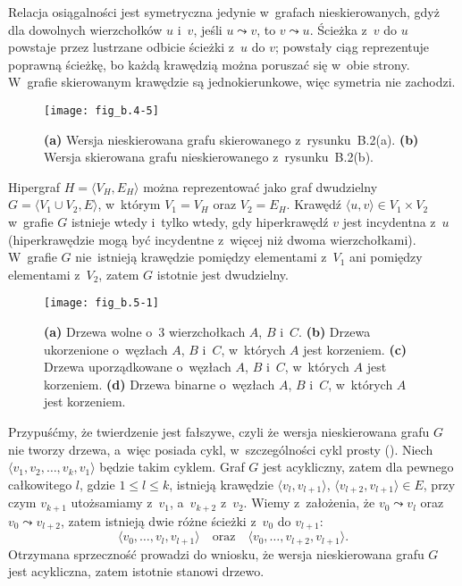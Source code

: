 Relacja osiągalności jest symetryczna jedynie w~grafach nieskierowanych, gdyż dla dowolnych wierzchołków $u$ i~$v$, jeśli $u\leadsto v$, to $v\leadsto u$.
Ścieżka z~$v$ do $u$ powstaje przez lustrzane odbicie ścieżki z~$u$ do $v$; powstały ciąg reprezentuje poprawną ścieżkę, bo każdą krawędzią można poruszać się w~obie strony.
W~grafie skierowanym krawędzie są jednokierunkowe, więc symetria nie zachodzi.

\exercise %
\begin{figure}[ht]
	\begin{center}
		\texttt{[image: fig\_b.4-5]}
	\end{center}
	\caption{{\sffamily\bfseries(a)} Wersja nieskierowana grafu skierowanego z~rysunku~B.2(a).
{\sffamily\bfseries(b)} Wersja skierowana grafu nieskierowanego z~rysunku~B.2(b).} \label{fig:B.4-5}
\end{figure}

\exercise %
Hipergraf $H=\langle V_H,E_H\rangle$ można reprezentować jako graf dwudzielny $G=\langle V_1\cup V_2,E\rangle$, w~którym $V_1=V_H$ oraz $V_2=E_H$.
Krawędź $\langle u,v\rangle\in V_1\times V_2$ w~grafie $G$ istnieje wtedy i~tylko wtedy, gdy hiperkrawędź $v$ jest incydentna z~$u$ (hiperkrawędzie mogą być incydentne z~więcej niż dwoma wierzchołkami).
W~grafie $G$ nie~istnieją krawędzie pomiędzy elementami z~$V_1$ ani pomiędzy elementami z~$V_2$, zatem $G$ istotnie jest dwudzielny.


\exercise %
\begin{figure}[ht]
	\begin{center}
		\texttt{[image: fig\_b.5-1]}
	\end{center}
	\caption{{\sffamily\bfseries(a)} Drzewa wolne o~3 wierzchołkach $A$, $B$ i~$C$.
{\sffamily\bfseries(b)} Drzewa ukorzenione o~węzłach $A$, $B$ i~$C$, w~których $A$ jest korzeniem.
{\sffamily\bfseries(c)} Drzewa uporządkowane o~węzłach $A$, $B$ i~$C$, w~których $A$ jest korzeniem.
{\sffamily\bfseries(d)} Drzewa binarne o~węzłach $A$, $B$ i~$C$, w~których $A$ jest korzeniem.} \label{fig:B.5-1}
\end{figure}

\exercise %
Przypuśćmy, że twierdzenie jest fałszywe, czyli że wersja nieskierowana grafu $G$ nie tworzy drzewa, a~więc posiada cykl, w~szczególności cykl prosty ().
Niech $\langle v_1,v_2,\dots,v_k,v_1\rangle$ będzie takim cyklem.
Graf $G$ jest acykliczny, zatem dla pewnego całkowitego $l$, gdzie $1\le l\le k$, istnieją krawędzie $\langle v_l,v_{l+1}\rangle$, $\langle v_{l+2},v_{l+1}\rangle\in E$, przy czym $v_{k+1}$ utożsamiamy z~$v_1$, a~$v_{k+2}$ z~$v_2$.
Wiemy z~założenia, że $v_0\leadsto v_l$ oraz $v_0\leadsto v_{l+2}$, zatem istnieją dwie różne ścieżki z~$v_0$ do $v_{l+1}$:
\[
	\langle v_0,\dots,v_l,v_{l+1}\rangle \quad\text{oraz}\quad \langle v_0,\dots,v_{l+2},v_{l+1}\rangle.
\]
Otrzymana sprzeczność prowadzi do wniosku, że wersja nieskierowana grafu $G$ jest acykliczna, zatem istotnie stanowi drzewo.

